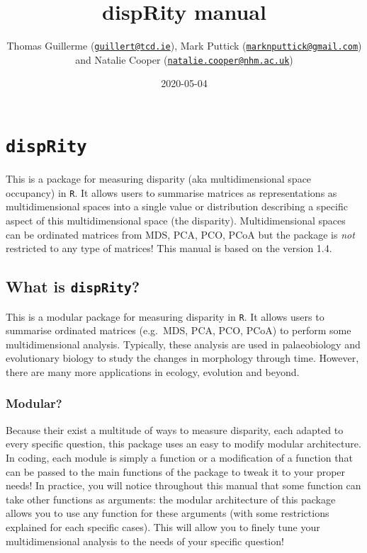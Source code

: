 \documentclass[]{book}
\title{dispRity manual}
\author{Thomas Guillerme (\href{mailto:guillert@tcd.ie}{\nolinkurl{guillert@tcd.ie}}),
Mark Puttick (\href{mailto:marknputtick@gmail.com}{\nolinkurl{marknputtick@gmail.com}}) and
Natalie Cooper (\href{mailto:natalie.cooper@nhm.ac.uk}{\nolinkurl{natalie.cooper@nhm.ac.uk}})}
\date{2020-05-04}
\begin{document}
\maketitle

{
\setcounter{tocdepth}{1}
\tableofcontents
}
\hypertarget{disprity}{%
\chapter{\texorpdfstring{\texttt{dispRity}}{dispRity}}\label{disprity}}

This is a package for measuring disparity (aka multidimensional space occupancy) in \texttt{R}.
It allows users to summarise matrices as representations as multidimensional spaces into a single value or distribution describing a specific aspect of this multidimensional space (the disparity).
Multidimensional spaces can be ordinated matrices from MDS, PCA, PCO, PCoA but the package is \emph{not} restricted to any type of matrices!
This manual is based on the version 1.4.

\hypertarget{what-is-disprity}{%
\section{\texorpdfstring{What is \texttt{dispRity}?}{What is dispRity?}}\label{what-is-disprity}}

This is a modular package for measuring disparity in \texttt{R}.
It allows users to summarise ordinated matrices (e.g.~MDS, PCA, PCO, PCoA) to perform some multidimensional analysis.
Typically, these analysis are used in palaeobiology and evolutionary biology to study the changes in morphology through time.
However, there are many more applications in ecology, evolution and beyond.

\hypertarget{modular}{%
\subsection{Modular?}\label{modular}}

Because their exist a multitude of ways to measure disparity, each adapted to every specific question, this package uses an easy to modify modular architecture.
In coding, each module is simply a function or a modification of a function that can be passed to the main functions of the package to tweak it to your proper needs!
In practice, you will notice throughout this manual that some function can take other functions as arguments: the modular architecture of this package allows you to use any function for these arguments (with some restrictions explained for each specific cases).
This will allow you to finely tune your multidimensional analysis to the needs of your specific question!
\end{document}
